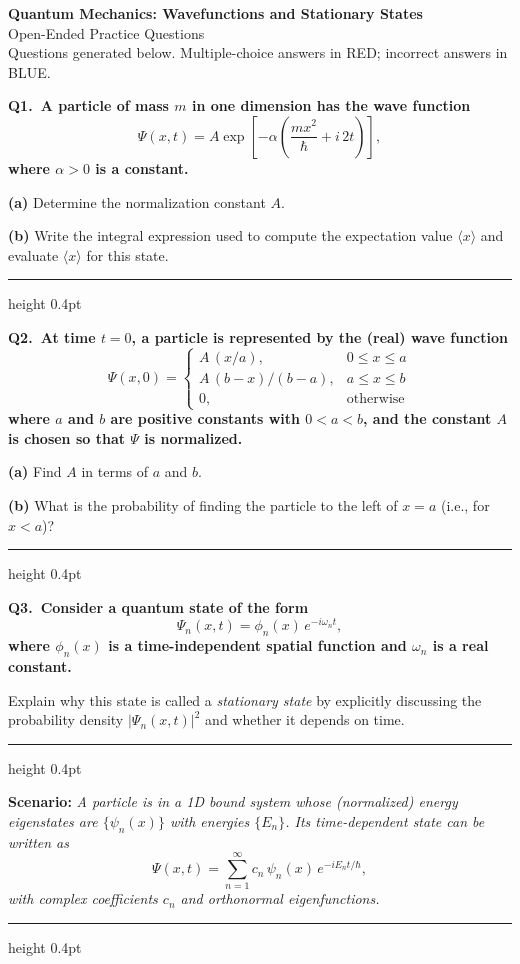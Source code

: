 \documentclass[11pt]{article}
\newcommand{\QuestionStyle}[1]{{\large\bfseries\boldmath #1}}
\newcommand{\OEBlock}[2]{%
  \Needspace{5\baselineskip}%
  \noindent
  \begin{minipage}{\linewidth}
    \QuestionStyle{#1.~#2}

    \vspace{0.25em}
    \hrule height 0.4pt
  \end{minipage}
  \vspace{0.75em}
}
\newcommand{\ScenarioBlock}[1]{%
  \Needspace{4\baselineskip}%
  \noindent
  \begin{minipage}{\linewidth}
    {\normalsize\textcolor{ScenarioTeal}{\textbf{Scenario:} \textit{#1}}}
    \vspace{0.25em}
    \hrule height 0.4pt
  \end{minipage}
  \vspace{0.5em}
}
\begin{document}
\begin{center}
{\huge \textbf{Quantum Mechanics: Wavefunctions and Stationary States}}\\[0.25em]
{\Large Open-Ended Practice Questions}\\[0.25em]
{\large Questions generated below. Multiple-choice answers in RED; incorrect answers in BLUE.}
\end{center}

\vspace{0.75em}

\OEBlock{Q1}{A particle of mass $m$ in one dimension has the wave function
\[
\Psi(x,t)=A\exp\!\left[-\alpha\left(\frac{m x^2}{\hbar}+ i\,2t\right)\right],
\]
where $\alpha>0$ is a constant.\par
\textbf{(a)} Determine the normalization constant $A$.\par
\textbf{(b)} Write the integral expression used to compute the expectation value $\langle x\rangle$ and evaluate $\langle x\rangle$ for this state.}

\OEBlock{Q2}{At time $t=0$, a particle is represented by the (real) wave function
\[
\Psi(x,0)=\begin{cases}
A\,(x/a), & 0\le x\le a\\
A\,(b-x)/(b-a), & a\le x\le b\\
0, & \text{otherwise}
\end{cases}
\]
where $a$ and $b$ are positive constants with $0<a<b$, and the constant $A$ is chosen so that $\Psi$ is normalized.\par
\textbf{(a)} Find $A$ in terms of $a$ and $b$.\par
\textbf{(b)} What is the probability of finding the particle to the left of $x=a$ (i.e., for $x<a$)?}

\OEBlock{Q3}{Consider a quantum state of the form
\[
\Psi_n(x,t)=\phi_n(x)\,e^{-i\omega_n t},
\]
where $\phi_n(x)$ is a time-independent spatial function and $\omega_n$ is a real constant.\par
Explain why this state is called a \emph{stationary state} by explicitly discussing the probability density $|\Psi_n(x,t)|^2$ and whether it depends on time.}

\ScenarioBlock{A particle is in a 1D bound system whose (normalized) energy eigenstates are $\{\psi_n(x)\}$ with energies $\{E_n\}$. Its time-dependent state can be written as
\[
\Psi(x,t)=\sum_{n=1}^{\infty} c_n\,\psi_n(x)\,e^{-iE_n t/\hbar},
\]
with complex coefficients $c_n$ and orthonormal eigenfunctions.}
\end{document}
